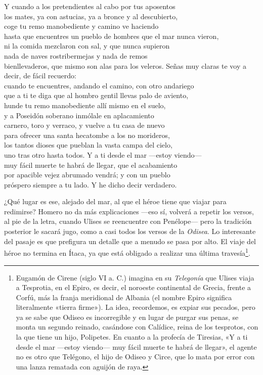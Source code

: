 \begin{versocita}
Y cuando a los pretendientes al cabo por tus aposentos\\
los mates, ya con astucias, ya a bronce y al descubierto,\\
coge tu remo manobediente y camino ve haciendo\\
hasta que encuentres un pueblo de hombres que el mar nunca vieron,\\
ni la comida mezclaron con sal, y que nunca supieron\\
nada de naves rostribermejas y nada de remos\\
bienllevaderos, que mismo son alas para los veleros.
\stanzabreak
Señas muy claras te voy a decir, de fácil recuerdo:\\
cuando te encuentres, andando el camino, con otro andariego\\
que a ti te diga que al hombro gentil llevas palo de aviento,\\
hunde tu remo manobediente allí mismo en el suelo,\\
y a Poseidón soberano inmólale en aplacamiento\\
carnero, toro y verraco, y vuelve a tu casa de nuevo\\
para ofrecer una santa hecatombe a los no morideros,\\
los tantos dioses que pueblan la vasta campa del cielo,\\
uno tras otro hasta todos. Y a ti desde el mar ---estoy viendo---\\
muy fácil muerte te habrá de llegar, que el acabamiento\\
por apacible vejez abrumado vendrá; y con un pueblo\\
próspero siempre a tu lado. Y he dicho decir verdadero.
\end{versocita}

¿Qué lugar es ese, alejado del mar, al que el héroe tiene que viajar para redimirse? Homero no da más explicaciones ---eso sí, volverá a repetir los versos, al pie de la letra, cuando Ulises se reencuentre con Penélope--- pero la tradición posterior le sacará jugo, como a casi todos los versos de la \emph{Odisea}. Lo interesante del pasaje es que prefigura un detalle que a menudo se pasa por alto. El viaje del héroe no termina en Ítaca, ya que está obligado a realizar una última travesía\footnote{Eugamón de Cirene (siglo VI a. C.) imagina en su \emph{Telegonía} que Ulises viaja a Tesprotia, en el Epiro, es decir, el noroeste continental de Grecia, frente a Corfú, más la franja meridional de Albania (el nombre Epiro significa literalmente «tierra firme»). La idea, recordemos, es expiar sus pecados, pero ya se sabe que Odiseo es incorregible y en lugar de purgar sus penas, se monta un segundo reinado, casándose con Calídice, reina de los tesprotos, con la que tiene un hijo, Polipetes. En cuanto a la profecía de Tiresias, «Y a ti desde el mar ---estoy viendo--- muy fácil muerte te habrá de llegar», el agente no es otro que Telégono, el hijo de Odiseo y Circe, que lo mata por error con una lanza rematada con aguijón de raya.}.

